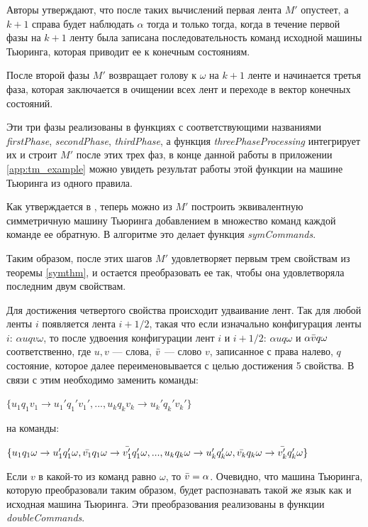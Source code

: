 \documentclass[14pt]{matmex-diploma-custom}
\begin{document}
Авторы утверждают, что после таких вычислений первая лента $M'$  опустеет, а $k+1$ справа будет наблюдать $\alpha$ тогда и только тогда, когда в течение первой фазы на $k+1$ ленту была записана последовательность команд исходной машины Тьюринга, которая приводит ее к конечным состояниям. 

После второй фазы $M'$ возвращает голову к $\omega$ на $k+1$ ленте и начинается третья фаза, которая заключается в очищении всех лент и переходе в вектор конечных состояний. 

Эти три фазы реализованы в функциях с соответствующими названиями \textit{firstPhase}, \textit{secondPhase}, \textit{thirdPhase}, а функция \textit{threePhaseProcessing} интегрирует их и строит $M'$ после этих трех фаз, в конце данной работы в приложении \ref{app:tm_example} можно увидеть результат работы этой функции на машине Тьюринга из одного правила. 

Как утверждается в \cite{symTM}, теперь можно из $M'$ построить эквивалентную симметричную машину Тьюринга добавлением в множество команд каждой команде ее обратную. В алгоритме это делает функция \textit{symCommands}. 

Таким образом, после этих шагов $M'$ удовлетворяет первым трем свойствам из теоремы \ref{symthm}, и остается преобразовать ее так, чтобы она удовлетворяла последним двум свойствам. 

Для достижения четвертого свойства происходит удваивание лент. Так для любой ленты $i$ появляется лента $i + 1/2$, такая что если изначально конфигурация ленты $i$: $\alpha u q v \omega$, то после удвоения конфигурации лент $i$ и $i+1/2$: $\alpha u q \omega$ и $\alpha \Bar{v} q \omega$ соответственно, где $u,v$ --- слова, $\Bar{v}$ --- слово $v$, записанное с права налево, $q$ состояние, которое далее переименовывается с целью достижения 5 свойства. В связи с этим необходимо заменить команды:
\begin{center}
    $\{ u_1 q_1 v_1 \to u_1' q_1' v_1',  ... , u_k q_k v_k \to u_k' q_k' v_k' \}$
\end{center}
на команды:
\begin{center}
    $\{ u_1 q_1 \omega \to u_1' q_1' \omega, \Bar{v_1} q_1 \omega \to \Bar{v'_1} q_1' \omega , ... , u_k q_k \omega \to u_k' q_k' \omega, \Bar{v_k} q_k \omega \to \Bar{v'_k} q_k' \omega \}$
\end{center}
Если $v$ в какой-то из команд равно $\omega$, то $\Bar{v} = \alpha$. Очевидно, что машина Тьюринга, которую преобразовали таким образом, будет распознавать такой же язык как и исходная машина Тьюринга. Эти преобразования реализованы в функции \textit{doubleCommands}. 
\end{document}
